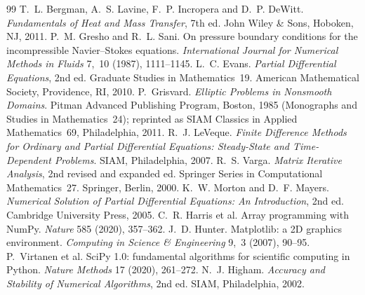 \documentclass[11pt,a4paper]{article}
\theoremstyle{palplain}
\theoremstyle{paldef}
\theoremstyle{palremark}
\begin{document}
\begin{thebibliography}{99}
 T.~L. Bergman, A.~S. Lavine, F.~P. Incropera and D.~P. DeWitt.
\emph{Fundamentals of Heat and Mass Transfer}, 7th ed. John Wiley \& Sons, Hoboken, NJ, 2011.
 P.~M. Gresho and R.~L. Sani. On pressure boundary conditions for the incompressible
Navier--Stokes equations. \emph{International Journal for Numerical Methods in Fluids}
7,~10 (1987), 1111--1145.
 L.~C. Evans. \emph{Partial Differential Equations}, 2nd ed. Graduate Studies in
Mathematics~19. American Mathematical Society, Providence, RI, 2010.
 P.~Grisvard. \emph{Elliptic Problems in Nonsmooth Domains}. Pitman Advanced
Publishing Program, Boston, 1985 (Monographs and Studies in Mathematics~24); reprinted as SIAM
Classics in Applied Mathematics~69, Philadelphia, 2011.
 R.~J. LeVeque. \emph{Finite Difference Methods for Ordinary and Partial Differential
Equations: Steady-State and Time-Dependent Problems}. SIAM, Philadelphia, 2007.
 R.~S. Varga. \emph{Matrix Iterative Analysis}, 2nd revised and expanded ed.
Springer Series in Computational Mathematics~27. Springer, Berlin, 2000.
 K.~W. Morton and D.~F. Mayers. \emph{Numerical Solution of Partial Differential
Equations: An Introduction}, 2nd ed. Cambridge University Press, 2005.
 C.~R. Harris et al. Array programming with NumPy. \emph{Nature} 585 (2020), 357--362.
 J.~D. Hunter. Matplotlib: a 2D graphics environment. \emph{Computing in Science
\& Engineering} 9,~3 (2007), 90--95.
 P.~Virtanen et al. SciPy 1.0: fundamental algorithms for scientific computing in Python.
\emph{Nature Methods} 17 (2020), 261--272.
 N.~J. Higham. \emph{Accuracy and Stability of Numerical Algorithms}, 2nd ed. SIAM,
Philadelphia, 2002.

\end{thebibliography}
\end{document}
